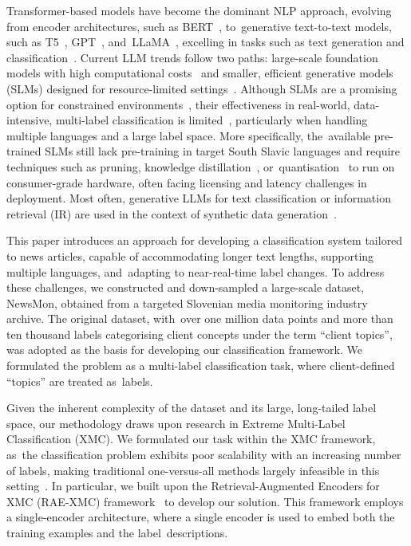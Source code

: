 \documentclass[make,article,accept,pdftex,moreauthors]{Definitions/mdpi}
\begin{document}
Transformer-based models have become the dominant NLP approach, evolving from encoder architectures, such as BERT~\citep{devlin2018bert}, to~generative text-to-text models, such as T5~\citep{raffel2020exploring}, GPT~\citep{brown2020language}, and~LLaMA~\citep{touvron2023llama2openfoundation}, excelling in tasks such as text generation and classification~\citep{tarekegn2024deeplearningmultilabellearning,li2022surveytextclassification}. 
Current LLM trends follow two paths: large-scale foundation models with high computational costs~\citep{dubey2024llama3herdmodels,openai2024gpt4technicalreport, geminiteam2024geminifamilyhighlycapable} and smaller, efficient generative models (SLMs) designed for resource-limited settings~\citep{abdin2024phi4technicalreport, gemma_2025}.
Although SLMs are a promising option for constrained environments~\citep{subramanian2025smalllanguagemodelsslms}, their effectiveness in real-world, data-intensive, multi-label classification is limited~\citep{vajjala2025textclassificationllmera}, particularly when handling multiple languages and a large label space.
More specifically, the~available pre-trained SLMs still lack pre-training in target South Slavic languages and require techniques such as pruning, knowledge distillation~\citep{muralidharan2024compact, gu2024minillmknowledgedistillationlarge}, or~quantisation~\citep{malinovskii2024pvtuningstraightthroughestimationextreme} to run on consumer-grade hardware, often facing licensing and latency challenges in deployment.
Most often, generative LLMs for text classification or information retrieval (IR) are used in the context of synthetic data generation~\citep{kuzman2025LLMteacher, vajjala2025textclassificationllmera}.

This paper introduces an approach for developing a classification system tailored to news articles, capable of accommodating longer text lengths, supporting multiple languages, and~adapting to near-real-time label changes. 
To address these challenges, we constructed and down-sampled a large-scale dataset, NewsMon, obtained from a targeted Slovenian media monitoring industry archive. 
The original dataset, with~over one million data points and more than ten thousand labels categorising client concepts under the term ``client topics'', was adopted as the basis for developing our classification framework.
We formulated the problem as a multi-label classification task, where client-defined ``topics'' are treated as~labels. 

Given the inherent complexity of the dataset and its large, long-tailed label space, our methodology draws upon research in Extreme Multi-Label Classification (XMC).
We formulated our task within the XMC framework, as~the classification problem exhibits poor scalability with an increasing number of labels, making traditional one-versus-all methods largely infeasible in this setting~\citep{dasgupta2025reviewextrememultilabelclassification}.
In particular, we built upon the Retrieval-Augmented Encoders for XMC (RAE-XMC) framework~\citep{wang2025retrievalaugmentedencodersextrememultilabel} to develop our solution.
This framework employs a single-encoder architecture, where a single encoder is used to embed both the training examples and the label~descriptions. 
\end{document}

